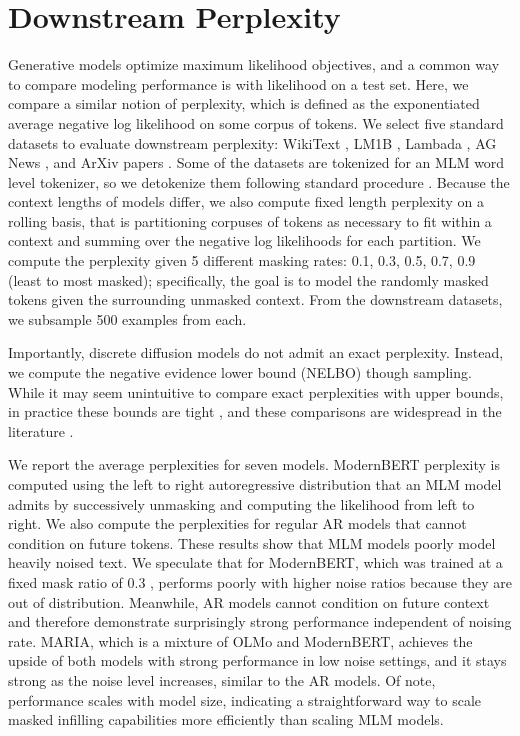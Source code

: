 \section*{Downstream Perplexity}
Generative models optimize maximum likelihood objectives, and a common way to compare modeling performance is with likelihood on a test set. Here, we compare a similar notion of perplexity, which is defined as the exponentiated average negative log likelihood on some corpus of tokens. We select five standard datasets to evaluate downstream perplexity: WikiText \cite{merity2016pointer}, LM1B \cite{chelba2014billion}, Lambada \cite{paperno2016lambadadatasetwordprediction}, AG News \cite{zhang2016characterlevelconvolutionalnetworkstext}, and ArXiv papers \cite{clement2019arxiv}. Some of the datasets are tokenized for an MLM word level tokenizer, so we detokenize them following standard procedure \cite{sahoo2024simpleeffectivemaskeddiffusion}. Because the context lengths of models differ, we also compute fixed length perplexity on a rolling basis, that is partitioning corpuses of tokens as necessary to fit within a context and summing over the negative log likelihoods for each partition. We compute the perplexity given 5 different masking rates: 0.1, 0.3, 0.5, 0.7, 0.9 (least to most masked); specifically, the goal is to model the randomly masked tokens given the surrounding unmasked context. From the downstream datasets, we subsample 500 examples from each.

Importantly, discrete diffusion models do not admit an exact perplexity. Instead, we compute the negative evidence lower bound (NELBO) though sampling. While it may seem unintuitive to compare exact perplexities with upper bounds, in practice these bounds are tight \cite{kingma2023variationaldiffusionmodels}, and these comparisons are widespread in the literature \cite{ho2020denoisingdiffusionprobabilisticmodels, gulrajani2023likelihoodbaseddiffusionlanguagemodels}.

We report the average perplexities for seven models. ModernBERT perplexity is computed using the left to right autoregressive distribution that an MLM model admits by successively unmasking and computing the likelihood from left to right. We also compute the perplexities for regular AR models that cannot condition on future tokens. These results show that MLM models poorly model heavily noised text. We speculate that for ModernBERT, which was trained at a fixed mask ratio of 0.3 \cite{warner2024smarter}, performs poorly with higher noise ratios because they are out of distribution. Meanwhile, AR models cannot condition on future context and therefore demonstrate surprisingly strong performance independent of noising rate. MARIA, which is a mixture of OLMo and ModernBERT, achieves the upside of both models with strong performance in low noise settings, and it stays strong as the noise level increases, similar to the AR models. Of note, performance scales with model size, indicating a straightforward way to scale masked infilling capabilities more efficiently than scaling MLM models.


